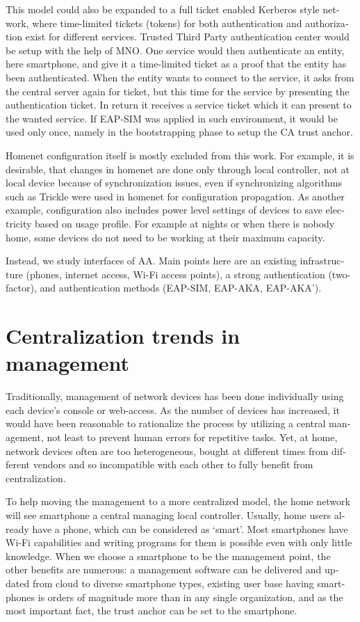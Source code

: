 \documentclass[12pt,a4paper,english]{tutthesis}
\begin{document}
\begin{otherlanguage}{english}
This model could also be expanded to a full ticket enabled
Kerberos style network, where time-limited tickets (tokens) for
both authentication and authorization exist for different services. Trusted
Third Party authentication center would be setup with the help of MNO.
One service would then authenticate an entity, here smartphone, and
give it a time-limited ticket as a proof that the entity has been authenticated.
When the entity wants to connect to the service, it asks from the central 
server again for ticket, but this time for the service by presenting
the authentication ticket. In return it receives a service ticket which
it can present to the wanted service. 
If EAP-SIM was applied in such environment, it would be used only once, namely in
the bootstrapping phase to setup the CA trust anchor.  






Homenet configuration itself is mostly excluded from this work.
For example, 
it is desirable, that changes in homenet are done only through
local controller, not at local device because of
synchronization issues, even 
if synchronizing algorithms such as Trickle\cite{rfc6206} were used in
homenet for configuration propagation. As another example,
configuration also includes
power level settings of devices to save electricity based on usage
profile. For example at nights or when there is nobody home, some
devices do not need to be working at their maximum capacity. 

Instead, we study interfaces of AA.  Main points here are an existing
infrastructure (phones, internet access, Wi-Fi access points),  a strong
authentication (two-factor), and authentication methods
(EAP-SIM, EAP-AKA, EAP-AKA').
\section{Centralization trends in management}
\label{sec-3-2}

Traditionally, management of network devices has been done
individually using each device's console or web-access.  As the number of
devices has increased, it would have been reasonable to rationalize
the process by utilizing a central management, not least to prevent human
errors for repetitive tasks.  Yet, at home, network devices often are
too heterogeneous, bought at different times from different vendors
and so incompatible with each other to fully benefit from
centralization. 

To help moving the management to a more centralized
model, the home network will see smartphone a central managing local
controller.
Usually, home users already have a phone, which can be considered as
`smart'. Most smartphones have Wi-Fi capabilities and writing programs
for them is possible even with only little knowledge.
When we choose a smartphone to be the management point, the other benefits are
numerous:  a management software can be delivered and
updated from cloud to diverse smartphone types, existing user
base having smartphones is orders of magnitude more than in any single
organization, and as the most important fact, the trust anchor can be set to the smartphone.


\end{otherlanguage}
\end{document}
